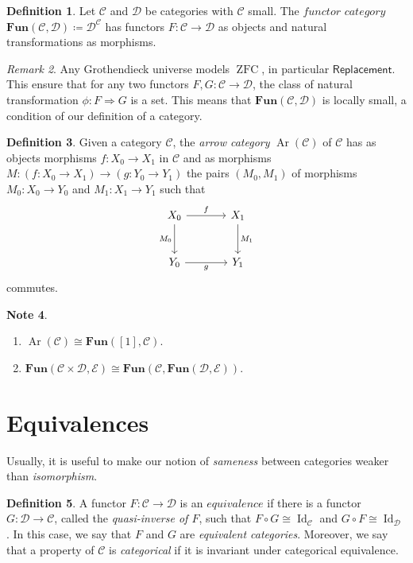 \documentclass[10pt,letterpaper,cm]{nupset}
\theoremstyle{definition}
\newtheorem{definition}{Definition}[section]
\newtheorem{note}[definition]{Note}
\theoremstyle{theorem}
\theoremstyle{remark}
\newtheorem{remark}[definition]{Remark}
\newcommand{\1}{\mathbf{1}}
\renewcommand{\c}{\mathscr{C}}
\renewcommand{\d}{\mathscr{D}}
\newcommand{\e}{\mathscr{E}}
\newcommand{\0}{\vec 0}
\DeclareMathOperator{\id}{Id}
\DeclareMathOperator{\ar}{Ar}
\DeclareMathOperator{\ZFC}{ZFC}
\begin{document}
\smallskip

\begin{definition}
Let $\c$ and $\d$ be categories with $\c$ small. The $\textit{functor category}$ $\mathbf{Fun}(\c, \d)\coloneqq \d^\c$ has functors $F: \c \to \d$ as objects and natural transformations as morphisms. 
\end{definition}


\begin{remark}
Any Grothendieck universe models $\ZFC$, in particular $\mathsf{Replacement}$. This ensure that for any two functors $F, G: \c \to \d$, the class of natural transformation $\phi: F \Rightarrow G$ is a set. This means that $\mathbf{Fun}(\c, \d)$ is locally small, a condition of our definition of a category.
\end{remark}

\begin{definition}
Given a category $\c$, the \textit{arrow category} $\ar(\c)$ of $\c$ has as objects morphisms $f: X_0 \to X_1$ in $\c$ and as morphisms $M: \left(f: X_0 \to X_1\right) \to \left(g: Y_0 \to Y_1\right)$ the pairs $\left(M_0, M_1\right)$ of morphisms $M_0 : X_0 \to Y_0$ and $M_1 : X_1 \to Y_1$ such that
\[
\begin{tikzcd}[row sep=large, column sep = large]
X_0 \arrow[r, "f"] \arrow[d, "M_0", swap]
& X_1 \arrow[d, "M_1"] \\
Y_0 \arrow[r, "g"']
& Y_1
\end{tikzcd}
\]
commutes. 
\end{definition}

\begin{note} $ $
\begin{enumerate}
\item $\ar(\c) \cong \mathbf{Fun}([1], \c)$.
\item $\mathbf{Fun}(\c \times \d, \e) \cong \mathbf{Fun}(\c, \mathbf{Fun}( \d, \e))$. 
\end{enumerate}
\end{note}

\section{Equivalences}

Usually, it is useful to make our notion of \textit{sameness} between categories weaker than \textit{isomorphism}.

\begin{definition}
A functor $F: \c \to \d$ is an $\textit{equivalence}$ if there is a functor $G: \d \to \c$, called the \textit{quasi-inverse of $F$}, such that $F \circ G \cong \id_{\c}$ and $G \circ F \cong \id_{\d}$. In this case, we say that $F$ and $G$ are \textit{equivalent categories}. Moreover, we say that a property of $\c$ is \textit{categorical} if it is invariant under categorical equivalence.
\end{definition}
\end{document}
